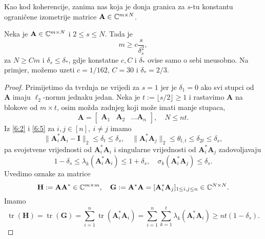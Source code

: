 \documentclass[a4paper,twoside,12pt]{memoir} %
\newcommand{\vect}[1]{\mathbf{#1}}
\renewcommand{\vec}{\vect}
\newcommand{\norm}[1]{\|{#1}\|}
\DeclareMathOperator{\tr}{tr}
\begin{document}
Kao kod koherencije, zanima nas koja je donja granica za $s$-tu konstantu ograni\v{c}ene izometrije matrice $\vec A \in \C^{m \times N}$.

\begin{thm}
    Neka je $\vec A \in \C^{m \times N}$ i $2 \leq s \leq N$. Tada je
    \begin{equation}\label{6:9}
        m \geq c \frac{s}{\delta_s^2} , 
    \end{equation}
    za $N \geq Cm$ i $\delta_s \leq \delta_*$, gdje konstatne $c, C$ i $\delta_*$ ovise samo o sebi me\dj usobno. Na primjer, mo\v{z}emo uzeti $c = 1/162$, $C = 30$ i $\delta_* = 2/3$.
\end{thm}
\begin{proof}
    Primijetimo da tvrdnja ne vrijedi za $s = 1$ jer je $\delta_1 = 0$ ako svi stupci od $\vec A$ imaju $\ell_2$-normu jednaku jedan. Neka je $t := \lfloor s/2 \rfloor \geq 1$ i rastavimo $\vec A$ na blokove od $m \times t$, osim mo\v{z}da zadnjeg koji mo\v{z}e imati manje stupaca,
    \begin{equation*}
        \vec A =
        \begin{bmatrix*}
            \vec A_1 & \vec A_2 & \dots \vec A_n 
        \end{bmatrix*},
        \quad  N \leq nt.
    \end{equation*}
    Iz \eqref{6:2} i \eqref{6:5} za $i,j \in [n],\ i \neq j$ imamo
    \begin{equation*}
        \norm{\vec A^*_i \vec A_i - \vec I}_2 \leq \delta_t \leq \delta_s, \quad \norm{\vec A^*_i \vec A_j}_2 \leq \theta_{t,t} \leq \delta_{2t} \leq \delta_s,
    \end{equation*}
    pa svojstvene vrijednosti od $\vec A^*_i \vec A_i$ i singularne vrijednosti od $\vec A^*_i \vec A_j$ zadovoljavaju
    \begin{equation*}
        1 - \delta_s \leq \lambda_k(\vec A^*_i \vec A_i) \leq 1 + \delta_s, \quad \sigma_k(\vec A^*_i \vec A_j) \leq \delta_s. 
    \end{equation*}
    Uvedimo oznake za matrice
    \begin{equation*}
        \vec H := \vec {AA}^* \in \C^{m \times m}, \quad \vec G := \vec A^* \vec A = [\vec A^*_i \vec A_j]_{1 \leq i,j \leq n} \in \C^{N \times N}. 
    \end{equation*}
    Imamo
    \begin{equation}\label{6:10}
        \tr(\vec H) = \tr(\vec G) = \sum_{i = 1}^{n} \tr(\vec A^*_i \vec A_i) = \sum_{i=1}^n \sum_{k=1}^t \lambda_k(\vec A^*_i \vec A_i) \geq nt(1-\delta_s).

\end{equation}
\end{proof}
\end{document}
